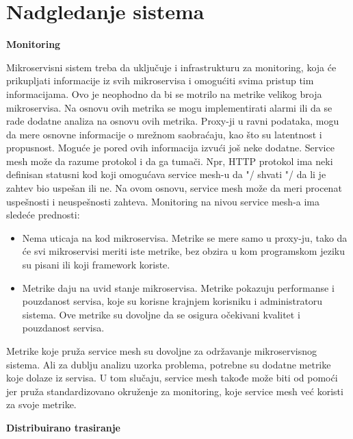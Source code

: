 \documentclass[a4paper,12pt]{report}
\begin{document}
\section{Nadgledanje sistema}

\textbf{Monitoring}\newline

Mikroservisni sistem treba da uključuje i infrastrukturu za monitoring, koja će prikupljati informacije iz svih mikroservisa i omogućiti svima pristup tim informacijama. Ovo je neophodno da bi se motrilo na metrike velikog broja mikroservisa. Na osnovu ovih metrika se mogu implementirati alarmi ili da se rade dodatne analiza na osnovu ovih metrika. Proxy-ji u ravni podataka, mogu da mere osnovne informacije o mrežnom saobraćaju, kao što su latentnost i propusnost. Moguće je pored ovih informacija izvući još neke dodatne. Service mesh može da razume protokol i da ga tumači. Npr, HTTP protokol ima neki definisan statusni kod koji omogućava service mesh-u da "/ shvati "/ da li je zahtev bio uspešan ili ne. Na ovom osnovu, service mesh može da meri procenat uspešnosti i neuspešnosti zahteva.  Monitoring na nivou service mesh-a ima sledeće prednosti: 

\begin{itemize}
	\item Nema uticaja na kod mikroservisa. Metrike se mere samo u proxy-ju, tako da će svi mikroservisi meriti iste metrike, bez obzira u kom programskom jeziku su pisani ili koji framework koriste.
	\item Metrike daju na uvid stanje mikroservisa. Metrike pokazuju performanse i pouzdanost servisa, koje su korisne krajnjem korisniku i administratoru sistema. Ove metrike su dovoljne da se osigura očekivani kvalitet i pouzdanost servisa. 
\end{itemize}

Metrike koje pruža service mesh su dovoljne za održavanje mikroservisnog sistema. Ali za dublju analizu uzorka problema, potrebne su dodatne metrike koje dolaze iz servisa. U tom slučaju, service mesh takođe može biti od pomoći jer pruža standardizovano okruženje za monitoring, koje service mesh već koristi za svoje metrike. \newline

\textbf{Distribuirano trasiranje}\newline
\end{document}

